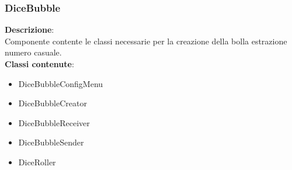 \subsubsection{DiceBubble}
   \FloatBarrier
\FloatBarrier
\textbf{Descrizione}:\\
 Componente contente le classi necessarie per la creazione della bolla estrazione numero casuale. 
\\ \textbf{Classi contenute}:\\
\begin{itemize}
\item DiceBubbleConfigMenu
\item DiceBubbleCreator
\item DiceBubbleReceiver
\item DiceBubbleSender
\item DiceRoller
\end{itemize}


\clearpage

